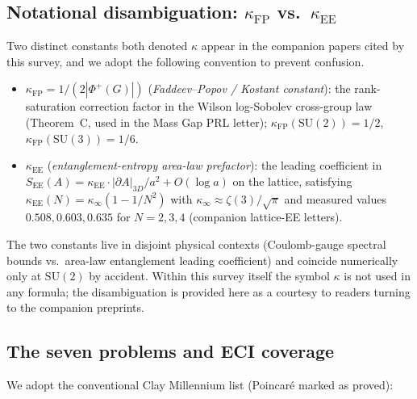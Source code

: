 \documentclass[11pt,a4paper]{article}
\theoremstyle{definition}
\begin{document}
\subsection{Notational disambiguation: $\kappa_{\mathrm{FP}}$ vs.\ $\kappa_{\mathrm{EE}}$}
\label{ss:kappa-disambiguation}

Two distinct constants both denoted $\kappa$ appear in the companion
papers cited by this survey, and we adopt the following convention to
prevent confusion.

\begin{itemize}
  \item $\kappa_{\mathrm{FP}} = 1/(2|\Phi^+(G)|)$ (\emph{Faddeev--Popov /
        Kostant constant}): the rank-saturation correction factor in
        the Wilson log-Sobolev cross-group law (Theorem~C, used in the
        Mass Gap PRL letter); $\kappa_{\mathrm{FP}}(\mathrm{SU}(2)) = 1/2$,
        $\kappa_{\mathrm{FP}}(\mathrm{SU}(3)) = 1/6$.
  \item $\kappa_{\mathrm{EE}}$ (\emph{entanglement-entropy area-law
        prefactor}): the leading coefficient in
        $S_{\mathrm{EE}}(A) = \kappa_{\mathrm{EE}} \cdot |\partial A|_{3D}/a^2
        + O(\log a)$ on the lattice, satisfying
        $\kappa_{\mathrm{EE}}(N) = \kappa_{\infty}(1 - 1/N^2)$ with
        $\kappa_{\infty} \approx \zeta(3)/\sqrt{\pi}$ and measured
        values $0.508, 0.603, 0.635$ for $N = 2, 3, 4$ (companion
        lattice-EE letters).
\end{itemize}

The two constants live in disjoint physical contexts (Coulomb-gauge
spectral bounds vs.\ area-law entanglement leading coefficient) and
coincide numerically only at $\mathrm{SU}(2)$ by accident. Within this
survey itself the symbol $\kappa$ is not used in any formula; the
disambiguation is provided here as a courtesy to readers turning to
the companion preprints.

\subsection{The seven problems and ECI coverage}
We adopt the conventional Clay Millennium list (Poincar\'e marked as
proved):
\end{document}
